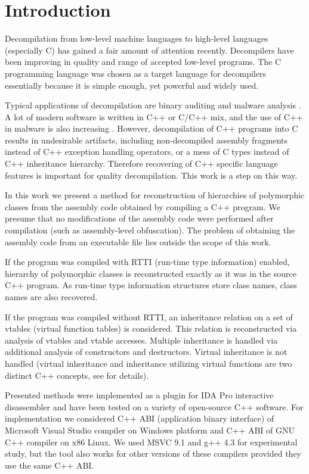 \documentclass[10pt, conference]{IEEEtran}
\begin{document}
\section{Introduction}
Decompilation from low-level machine languages to high-level
languages (especially C) has gained a fair amount of attention
recently. Decompilers have been improving in quality and range
of accepted low-level programs. The C programming language
was chosen as a target language for decompilers essentially
because it is simple enough, yet powerful and widely used.

Typical applications of decompilation are binary auditing
and malware analysis \cite{emmerik07}. A lot of modern software
is written in C++ or C/C++ mix, and the use of
C++ in malware is also increasing \cite{sabanal07}.
However, decompilation of C++
programs into C results in undesirable artifacts, including
non-decompiled assembly fragments instead of C++ exception
handling operators, or a mess of C types instead of C++
inheritance hierarchy. Therefore recovering of C++ specific
language features is important for quality decompilation.
This work is a step on this way.

In this work we present a method for reconstruction of
hierarchies of polymorphic classes from the assembly code obtained
by compiling a C++ program.
We presume
that no modifications of the assembly code were performed
after compilation (such as assembly-level obfuscation).
The problem of obtaining the assembly code from an executable file
lies outside the scope of this work.

If the program was compiled with RTTI (run-time type information)
enabled, hierarchy of polymorphic classes is
reconstructed exactly as it was in the source C++ program.
As run-time type information structures store class names,
class names are also recovered.

If the program was compiled without RTTI,
an inheritance relation on
a set of vtables (virtual function tables) is considered.
This relation is reconstructed via analysis of vtables and vtable accesses.
Multiple inheritance is handled via additional analysis of
constructors and destructors.
Virtual inheritance is not handled (virtual
inheritance and inheritance utilizing virtual functions are
two distinct C++ concepts, see \cite{stroustrup97} for details).

Presented methods were implemented as a plugin for IDA Pro
interactive disassembler \cite{ida} and have been tested on a variety
of open-source C++ software.
For implementation we considered C++ ABI
(application binary interface) of Microsoft Visual Studio
compiler on Windows platform and C++ ABI
of GNU C++ compiler on x86 Linux. We used MSVC 9.1 and g++ 4.3
for experimental study, but the tool also works for
other versions of these compilers provided they use the same C++ ABI.
\end{document}
